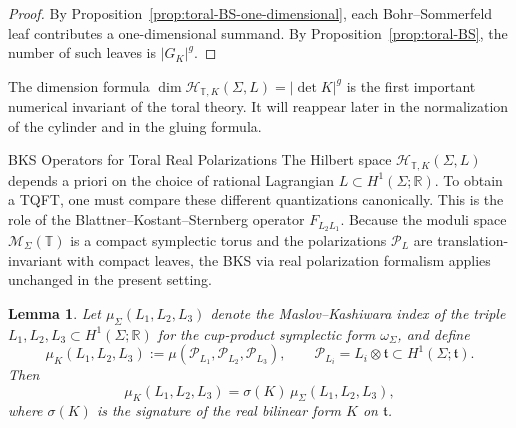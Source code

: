 \documentclass[12pt]{amsart}
\makeatletter
\renewcommand\subsection{\@startsection{subsection}{2}%
  \z@{.5\linespacing\@plus.7\linespacing}{-.5em}%
  {\normalfont\bfseries}}
\numberwithin{equation}{section}
\newtheorem{lemma}[theorem]{Lemma}
\makeatother
\begin{document}
\begin{proof}
By Proposition~\ref{prop:toral-BS-one-dimensional}, each Bohr--Sommerfeld leaf
contributes a one-dimensional summand. By
Proposition~\ref{prop:toral-BS}, the number of such leaves is
$|G_K|^g$.
\end{proof}

The dimension formula \(\dim \mathcal H_{\mathbb T,K}(\Sigma,L)=|\det K|^g\) is the first important
numerical invariant of the toral theory. It will reappear later in the
normalization of the cylinder and in the gluing formula.


\subsection{BKS Operators for Toral Real Polarizations}
The Hilbert space \(\mathcal H_{\mathbb T,K}(\Sigma,L)\) depends a priori on the choice of rational Lagrangian \(L\subset H^1(\Sigma;\mathbb R)\). To obtain a
TQFT, one must compare these different quantizations canonically. This is the role of the Blattner--Kostant--Sternberg operator
\(F_{L_2L_1}\). Because the moduli space $\mathcal M_\Sigma(\mathbb T)$ is a compact symplectic torus and the
polarizations $\mathcal P_L$ are translation-invariant with compact leaves, the  BKS via real polarization formalism  applies unchanged in the present setting.

\begin{lemma}
\label{lem:toral-maslov-signature}
Let $\mu_\Sigma(L_1,L_2,L_3)$ denote the Maslov--Kashiwara index of the triple
$L_1,L_2,L_3 \subset H^1(\Sigma;\mathbb R)$ for the cup-product symplectic form
$\omega_\Sigma$, and define
\[
\mu_K(L_1,L_2,L_3)
:=
\mu(\mathcal P_{L_1},\mathcal P_{L_2},\mathcal P_{L_3}),
\qquad
\mathcal P_{L_i}=L_i\otimes \mathfrak t
\subset H^1(\Sigma;\mathfrak t).
\]
Then
\[
\mu_K(L_1,L_2,L_3)=\sigma(K)\,\mu_\Sigma(L_1,L_2,L_3),
\]
where $\sigma(K)$ is the signature of the real bilinear form $K$ on $\mathfrak t$.
\end{lemma}
\end{document}
